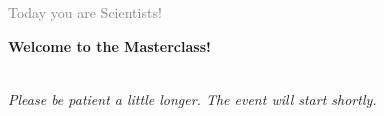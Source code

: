 


\begin{frame}{\small \hfill \textcolor{gray}{Today you are Scientists!}}
\, \vspace{0.1cm}  \Large  \begin{center}
    \textbf{Welcome to the Masterclass!} 
\end{center} 
  \small \, \vspace{1cm} \\
    \emph{Please be patient a little longer. The event will start shortly.}
\end{frame}
